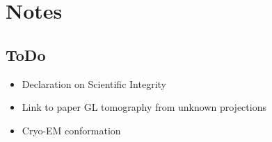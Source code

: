 \chapter{Notes}

\section{ToDo}
\begin{itemize}
    \item Declaration on Scientific Integrity
    \item Link to paper GL tomography from unknown projections
    \item Cryo-EM conformation
\end{itemize}



\clearpage
